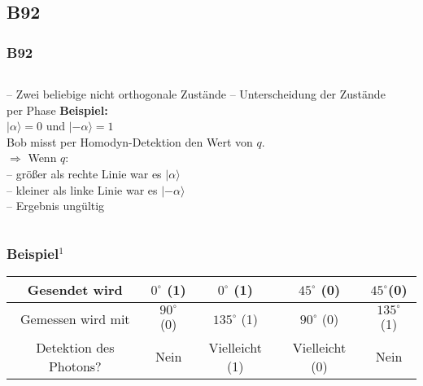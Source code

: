 \subsection{B92}
\begin{frame}
	\frametitle{B92}
	\begin{columns}
		\begin{column}{0.6\linewidth}
			-- Zwei beliebige nicht orthogonale Zustände 
			-- Unterscheidung der Zustände per Phase
			\hspace{0.5em}
			\textbf{Beispiel:}\\
			$|\alpha\rangle = 0$ und $|-\alpha\rangle = 1$\\
			Bob misst per Homodyn-Detektion den Wert von $q$.\\
			$\Rightarrow$ Wenn $q$:\\
			\hspace{0.5em}-- größer als rechte Linie war es $|\alpha\rangle$\\
			\hspace{0.5em}-- kleiner als linke Linie war es $|-\alpha\rangle$\\
			\hspace{0.5em}-- Ergebnis ungültig
		\end{column}
		\begin{column}{0.39\linewidth}
		\end{column}
	\end{columns}
\end{frame}

\begin{frame}
	\frametitle{Beispiel$^{1}$}
	
	\begingroup
	\begin{tabular}{|c|c|c|c|c|}
		\hline
		Gesendet wird & $0^{\circ}$ (1) & $0^{\circ}$ (1) & $45^{\circ}$ (0) & $45^{\circ}$(0) \\
		\hline
		Gemessen wird mit & $90^{\circ}$ (0) & $135^{\circ}$ (1) & $90^{\circ}$ (0) & $135^{\circ}$ (1) \\
		\hline
		Detektion des Photons? & Nein & Vielleicht (1) & Vielleicht (0) & Nein \\
		\hline
	\end{tabular}
	\endgroup
	
\end{frame}